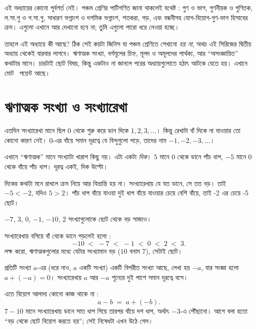 \documentclass[11pt]{article}
\begin{document}

\noindent
এই অধ্যায়ের কোনো পূর্বশর্ত নেই। পঞ্চম শ্রেণির পাটিগণিত জানা থাকলেই যথেষ্ট :
গুণ ও ভাগ, গুণনীয়ক ও গুণিতক, ল.সা.গু ও গ.সা.গু, সাধারণ ভগ্নাংশ ও দশমিক ভগ্নাংশ,
শতকরা, গড়, এবং বন্ধনীসহ যোগ-বিয়োগ-গুণ-ভাগ হিসাবের ক্রম। এগুলো এখানে আর দেখানো হবে না; তুমি
এগুলো পারো ধরে নেওয়া হচ্ছে।

\noindent
তাহলে এই অধ্যায়ে কী আছে? ঠিক সেই কয়টা জিনিস যা পঞ্চম শ্রেণিতে শেখানো
\emph{হয় না}, অথচ এই সিরিজের দ্বিতীয় অধ্যায় থেকেই বারবার লাগবে। ঋণাত্মক
সংখ্যা, বর্গমূলের চিহ্ন, মূলদ ও অমূলদের পার্থক্য, আর ``অসংজ্ঞায়িত'' কথাটার
মানে। চারটাই ছোট বিষয়, কিন্তু একটাও না জানলে পরের অধ্যায়গুলোতে হঠাৎ
আটকে যেতে হয়। এখানে মোট \totalpoints\ পয়েন্ট আছে।

\section{ঋণাত্মক সংখ্যা ও সংখ্যারেখা}

\begin{idea}[সংখ্যারেখা দুদিকেই চলে]
এতদিন সংখ্যারেখা মানে ছিল $0$ থেকে শুরু করে ডান দিকে $1, 2, 3, \dots$। কিন্তু
রেখাটা বাঁ দিকে না যাওয়ার তো কোনো কারণ নেই। $0$-এর বাঁয়ে সমান দূরত্বে যে বিন্দুগুলো
পড়ে, তাদের নাম $-1, -2, -3, \dots$।

এখানে ``ঋণাত্মক'' মানে সংখ্যাটা খারাপ  কিছু নয়। এটা একটা \emph{দিক}।
$5$ মানে $0$ থেকে ডানে পাঁচ ধাপ, $-5$ মানে $0$ থেকে বাঁয়ে পাঁচ ধাপ। দূরত্ব
একই, দিক উল্টো।
\end{idea}

\noindent
দিকের কথাটা মনে রাখলে ক্রম নিয়ে আর বিভ্রান্তি হয় না। সংখ্যারেখায় যে যত ডানে,
সে তত বড়। তাই $-5 < -2$, যদিও $5 > 2$। পাঁচ ধাপ বাঁয়ে যাওয়া দুই ধাপ বাঁয়ে
যাওয়ার চেয়ে বেশি বাঁয়ে, তাই -2 এর চেয়ে -5 ছোট।

\begin{example}
$-7$, $3$, $0$, $-1$, $-10$, $2$ সংখ্যাগুলোকে ছোট থেকে বড় সাজাও।
\end{example}

\begin{solbox}
সংখ্যারেখায় বসিয়ে বাঁ থেকে ডানে পড়লেই হলো :
\[
  -10 \;<\; -7 \;<\; -1 \;<\; 0 \;<\; 2 \;<\; 3 .
\]
লক্ষ করো, ঋণাত্মকগুলোর মধ্যে যেটার সংখ্যামান বড় ($10$ বনাম $7$), সেটাই ছোট।
\end{solbox}

\begin{idea}[বিয়োগ মানে বিপরীত সংখ্যা যোগ]
প্রতিটি সংখ্যা $a$-এর (ধরে নাও, $a$ একটি সংখ্যা) একটি বিপরীত সংখ্যা আছে, লেখা হয় $-a$, যার সংজ্ঞা হলো
$a + (-a) = 0$। সংখ্যারেখায় $a$ আর $-a$ শূন্যের দুই পাশে সমান দূরত্বে বসে।

এতে বিয়োগ আলাদা কোনো কাজ থাকে না :
\[
  a - b \;=\; a + (-b) .
\]
$7 - 10$ মানে সংখ্যারেখায় ডানে সাত ধাপ গিয়ে তারপর বাঁয়ে দশ ধাপ, অর্থাৎ $-3$-এ পৌঁছানো।
আগে বলা হতো ``বড় থেকে ছোট বিয়োগ করতে হয়''; সেই নিষেধটা এখন উঠে গেল।
\end{idea}
\end{document}
